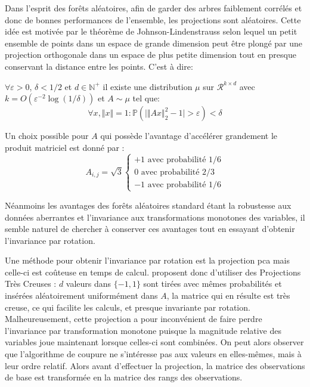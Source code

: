 Dans l'esprit des forêts aléatoires, afin de garder des arbres faiblement corrélés et donc de bonnes performances de l'ensemble, les projections sont aléatoires. Cette idée est motivée par le théorème de Johnson-Lindenstrauss \citep{Achlioptas2003} selon lequel un petit ensemble de points dans un espace de grande dimension peut être plongé par une projection orthogonale dans un espace de plus petite dimension tout en presque conservant la distance entre les points. C'est à dire:
\begin{lem}
    $\forall \varepsilon > 0$, $\delta < 1/2$ et $d \in \mathbb{N}^+$ il existe une distribution $\mu$ sur $\mathcal{R}^{k \times d}$ avec $k = O( \varepsilon^{-2} \log ( 1 / \delta) )$ et $A \sim \mu$ tel que:
    \begin{equation*}
        \forall x , \Vert x \Vert = 1 : \mathbb{P} \left( \vert \Vert A x \Vert^2_2 - 1 \vert > \varepsilon \right) < \delta
    \end{equation*}
\end{lem}
Un choix possible pour $A$ qui possède l'avantage d'accélérer grandement le produit matriciel est donné par \citet{Achlioptas2003}:
\begin{equation*}
    A_{i,j} = \sqrt{3} \begin{cases}
        +1 \text{ avec probabilité } 1/6 \\
        0 \text{ avec probabilité } 2/3 \\
        -1 \text{ avec probabilité } 1/6
    \end{cases}
\end{equation*}

Néanmoins les avantages des forêts aléatoires standard étant la robustesse aux données aberrantes et l'invariance aux transformations monotones des variables, il semble naturel de chercher à conserver ces avantages tout en essayant d'obtenir l'invariance par rotation.

Une méthode pour obtenir l'invariance par rotation est la projection \ac{pca} mais celle-ci est coûteuse en temps de calcul. \citet{Tomita2015} proposent donc d'utiliser des Projections Très Creuses \citep{Li2006}: $d$ valeurs dans $\{-1,1\}$ sont tirées avec mêmes probabilités et insérées aléatoirement uniformément dans $A$, la matrice qui en résulte est très creuse, ce qui facilite les calculs, et presque invariante par rotation. Malheureusement, cette projection a pour inconvénient de faire perdre l'invariance par transformation monotone puisque la magnitude relative des variables joue maintenant lorsque celles-ci sont combinées. On peut alors observer que l'algorithme de coupure ne s'intéresse pas aux valeurs en elles-mêmes, mais à leur ordre relatif. Alors avant d'effectuer la projection, la matrice des observations de base est transformée en la matrice des rangs des observations. 

